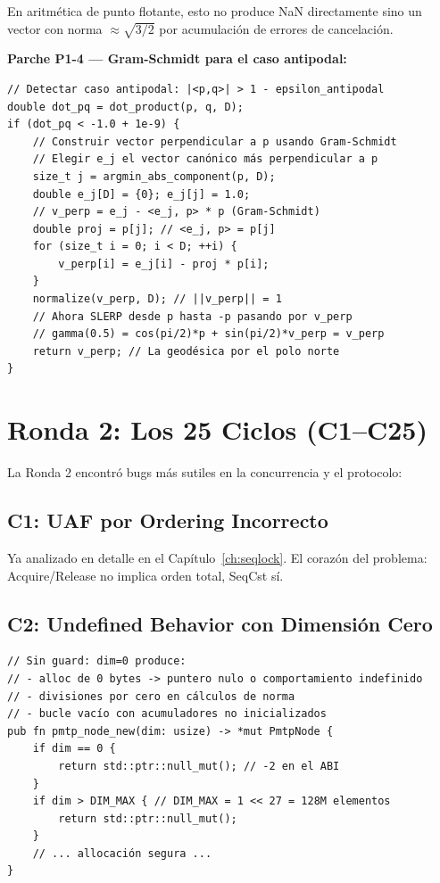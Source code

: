 En aritmética de punto flotante, esto no produce NaN directamente sino un vector
con norma $\approx \sqrt{3/2}$ por acumulación de errores de cancelación.

\textbf{Parche P1-4 --- Gram-Schmidt para el caso antipodal:}
\begin{lstlisting}[style=cppstyle, caption={P1-4: Gram-Schmidt antipodal (CORRECTO)}, label=lst:antipodal_fix]
// Detectar caso antipodal: |<p,q>| > 1 - epsilon_antipodal
double dot_pq = dot_product(p, q, D);
if (dot_pq < -1.0 + 1e-9) {
    // Construir vector perpendicular a p usando Gram-Schmidt
    // Elegir e_j el vector canónico más perpendicular a p
    size_t j = argmin_abs_component(p, D);
    double e_j[D] = {0}; e_j[j] = 1.0;
    // v_perp = e_j - <e_j, p> * p (Gram-Schmidt)
    double proj = p[j]; // <e_j, p> = p[j]
    for (size_t i = 0; i < D; ++i) {
        v_perp[i] = e_j[i] - proj * p[i];
    }
    normalize(v_perp, D); // ||v_perp|| = 1
    // Ahora SLERP desde p hasta -p pasando por v_perp
    // gamma(0.5) = cos(pi/2)*p + sin(pi/2)*v_perp = v_perp
    return v_perp; // La geodésica por el polo norte
}
\end{lstlisting}

\section{Ronda 2: Los 25 Ciclos (C1--C25)}

La Ronda 2 encontró bugs más sutiles en la concurrencia y el protocolo:

\subsection{C1: UAF por Ordering Incorrecto}

Ya analizado en detalle en el Capítulo~\ref{ch:seqlock}. El corazón del problema:
Acquire/Release no implica orden total, SeqCst sí.

\subsection{C2: Undefined Behavior con Dimensión Cero}

\begin{lstlisting}[style=ruststyle, caption={C2: guard dim=0 (CORRECTO)}, label=lst:dim0_guard]
// Sin guard: dim=0 produce:
// - alloc de 0 bytes -> puntero nulo o comportamiento indefinido
// - divisiones por cero en cálculos de norma
// - bucle vacío con acumuladores no inicializados
pub fn pmtp_node_new(dim: usize) -> *mut PmtpNode {
    if dim == 0 {
        return std::ptr::null_mut(); // -2 en el ABI
    }
    if dim > DIM_MAX { // DIM_MAX = 1 << 27 = 128M elementos
        return std::ptr::null_mut();
    }
    // ... allocación segura ...
}
\end{lstlisting}

